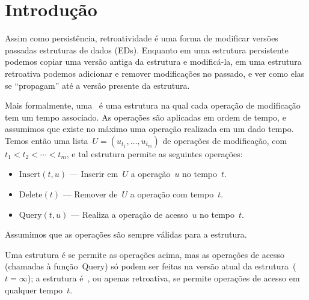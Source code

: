 \documentclass[../../main.tex]{subfiles}
\begin{document}
\chapter*{Introdução}

Assim como persistência, retroatividade é uma forma de modificar versões passadas estruturas de dados (EDs). Enquanto em uma estrutura persistente podemos copiar uma versão antiga da estrutura e modificá-la, em uma estrutura retroativa podemos adicionar e remover modificações no passado, e ver como elas se ``propagam'' até a versão presente da estrutura.

Mais formalmente, uma~ é uma estrutura na qual cada operação de modificação tem um tempo associado. As operações são aplicadas em ordem de tempo, e assumimos que existe no máximo uma operação realizada em um dado tempo. Temos então uma lista~${U = (u_{t_1}, \ldots, u_{t_m})}$ de operações de modificação, com~${t_1 < t_2 < \cdots < t_m}$, e tal estrutura permite as seguintes operações:

\begin{itemize}
	\item $\text{Insert}(t, u)$ --- Inserir em~$U$ a operação~$u$ no tempo~$t$.
	\item $\text{Delete}(t)$ --- Remover de~$U$ a operação com tempo~$t$.
	\item $\text{Query}(t, u)$ --- Realiza a operação de acesso~$u$ no tempo~$t$.
\end{itemize}

Assumimos que as operações são sempre válidas para a estrutura.

Uma estrutura é  se permite as operações acima, mas as operações de acesso (chamadas à função~Query) só podem ser feitas na versão atual da estrutura~(${t = \infty}$); a estrutura é~, ou apenas retroativa, se permite operações de acesso em qualquer tempo~$t$.
\end{document}
